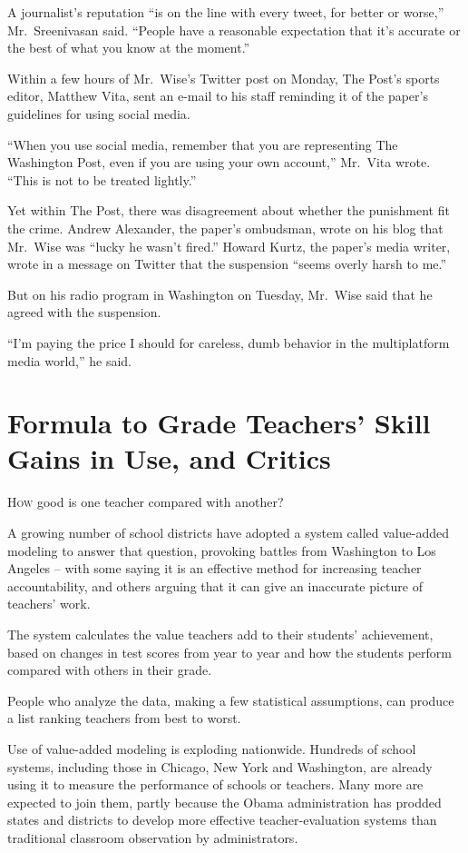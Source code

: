 ﻿\documentclass[12pt]{article}
\begin{document}
A journalist's reputation ``is on the line with every tweet, for better or worse,'' Mr.~Sreenivasan
said. ``People have a reasonable expectation that it's accurate or the best of what you know at the
moment.''

Within a few hours of Mr.~Wise's Twitter post on Monday, The Post's sports editor, Matthew Vita,
sent an e-mail to his staff reminding it of the paper's guidelines for using social media.

``When you use social media, remember that you are representing The Washington Post, even if you are
using your own account,'' Mr.~Vita wrote. ``This is not to be treated lightly.''

Yet within The Post, there was disagreement about whether the punishment fit the crime. Andrew
Alexander, the paper's ombudsman, wrote on his blog that Mr.~Wise was ``lucky he wasn't fired.''
Howard Kurtz, the paper's media writer, wrote in a message on Twitter that the suspension ``seems
overly harsh to me.''

But on his radio program in Washington on Tuesday, Mr.~Wise said that he agreed with the suspension.

``I'm paying the price I should for careless, dumb behavior in the multiplatform media world,'' he
said.

\pagebreak
\section{Formula to Grade Teachers' Skill Gains in Use, and Critics}

\lettrine{H}{ow} good is one teacher compared with another?

A growing number of school districts have adopted a system called value-added modeling to answer
that question, provoking battles from Washington to Los Angeles -- with some saying it is an
effective method for increasing teacher accountability, and others arguing that it can give an
inaccurate picture of teachers' work.

The system calculates the value teachers add to their students' achievement, based on changes in
test scores from year to year and how the students perform compared with others in their grade.

People who analyze the data, making a few statistical assumptions, can produce a list ranking
teachers from best to worst.

Use of value-added modeling is exploding nationwide. Hundreds of school systems, including those in
Chicago, New York and Washington, are already using it to measure the performance of schools or
teachers. Many more are expected to join them, partly because the Obama administration has prodded
states and districts to develop more effective teacher-evaluation systems than traditional classroom
observation by administrators.
\end{document}
